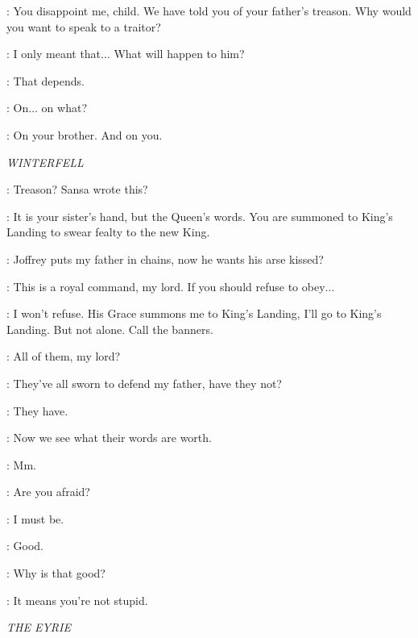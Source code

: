 \CERSEI: You disappoint me, child. We have told you of your father's treason. Why would you want to speak to a traitor? 

\SANSA: I only meant that$\ldots$ What will happen to him? 

\CERSEI: That depends. 

\SANSA: On$\ldots$ on what? 

\CERSEI: On your brother. And on you. 


\scene

\textit{WINTERFELL} 


\ROBB:  Treason? Sansa wrote this? 

\LUWIN: It is your sister's hand, but the Queen's words. You are summoned to King's Landing to swear fealty to the new King. 

\ROBB: Joffrey puts my father in chains, now he wants his arse kissed? 

\LUWIN: This is a royal command, my lord. If you should refuse to obey$\ldots$

\ROBB: I won't refuse. His Grace summons me to King's Landing, I'll go to King's Landing. But not alone. Call the banners. 

\LUWIN: All of them, my lord? 

\ROBB: They've all sworn to defend my father, have they not? 

\LUWIN: They have. 

\ROBB: Now we see what their words are worth. 

\LUWIN: Mm.


\THEON: Are you afraid? 


\ROBB: I must be. 

\THEON: Good. 

\ROBB: Why is that good? 

\THEON: It means you're not stupid. 



\scene

\textit{THE EYRIE} 


